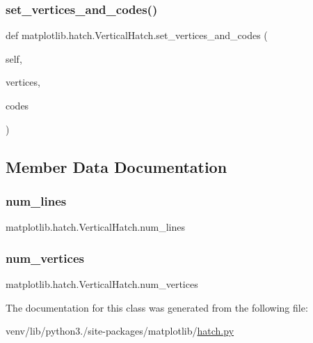\subsubsection{\texorpdfstring{set\+\_\+vertices\+\_\+and\+\_\+codes()}{set\_vertices\_and\_codes()}}
{\footnotesize\ttfamily def matplotlib.\+hatch.\+Vertical\+Hatch.\+set\+\_\+vertices\+\_\+and\+\_\+codes (\begin{DoxyParamCaption}\item[{}]{self,  }\item[{}]{vertices,  }\item[{}]{codes }\end{DoxyParamCaption})}



\subsection{Member Data Documentation}
\mbox{\label{classmatplotlib_1_1hatch_1_1VerticalHatch_a80c5716142d924d67071ba3434dd795b}} 
\subsubsection{\texorpdfstring{num\+\_\+lines}{num\_lines}}
{\footnotesize\ttfamily matplotlib.\+hatch.\+Vertical\+Hatch.\+num\+\_\+lines}

\mbox{\label{classmatplotlib_1_1hatch_1_1VerticalHatch_a19f55ca52b994d6f34eead9fc9d852cb}} 
\subsubsection{\texorpdfstring{num\+\_\+vertices}{num\_vertices}}
{\footnotesize\ttfamily matplotlib.\+hatch.\+Vertical\+Hatch.\+num\+\_\+vertices}



The documentation for this class was generated from the following file\+:\begin{DoxyCompactItemize}
\item 
venv/lib/python3./site-\/packages/matplotlib/\hyperlink{hatch_8py}{hatch.\+py}\end{DoxyCompactItemize}
